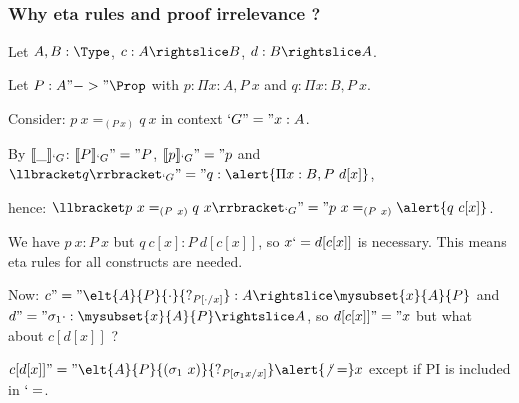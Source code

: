 \subsection*{}
\begin{frame}
  \frametitle{Why eta rules and proof irrelevance ?}
  
  Let $A,B : \Type$, $c : A \suba B$, $d : B \suba A$. 
  \pause
  
  Let $P : A "->" \Prop$ with $p : \Pi x : A, P~x$ and $q : \Pi x : B,
  P~x$.
  
  \pause
  Consider: $p~x =_{(P~x)} q~x$ in context $`G "=" x : A$. 
  
  By $\llbracket \_ \rrbracket_{`G}$: $\llbracket P \rrbracket_{`G} "=" P$, $\llbracket p \rrbracket_{`G} "=" p$ and
  $\ip{q}{`G} "=" q : \alert{\Pi x : B, P~d[x]}$, \pause 
  
  hence: $\ip{p~x =_{(P~x)} q~x}{`G} "=" p~x =_{(P~x)} \alert{q~c[x]}$.

  We have $p~x : P~x$ but $q~c[x] : P~d[c[x]]$, so $x `= d[c[x]]$ is
  necessary.
  This means eta rules for all constructs are needed.
  \pause
  
  Now: $c "=" \elt{A}{P}{\cdot}{?_{P[\cdot/x]}} : A \suba
  \mysubset{x}{A}{P}$ and $d "=" \eltpit{\cdot} : \mysubset{x}{A}{P}
  \suba A$, so $d[c[x]] "=" x$ but what about $c[d[x]]$ ? 
  \pause

  $c[d[x]] "=" \elt{A}{P}{(\eltpit~x)}{?_{P[\eltpit x/x]}} \alert{\not`=}
  x$ except if PI is included in $`=$.
  
\end{frame}




